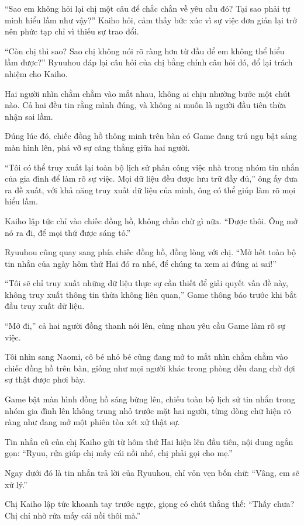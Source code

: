 \documentclass[../main.tex]{subfiles}
\begin{document}
``Sao em không hỏi lại chị một câu để chắc chắn về yêu cầu đó? Tại sao phải tự mình hiểu lầm như vậy?'' Kaiho hỏi, cảm thấy bức xúc vì sự việc đơn giản lại trở nên phức tạp chỉ vì thiếu sự trao đổi.

``Còn chị thì sao? Sao chị không nói rõ ràng hơn từ đầu để em không thể hiểu lầm được?'' Ryuuhou đáp lại câu hỏi của chị bằng chính câu hỏi đó, đổ lại trách nhiệm cho Kaiho.

Hai người nhìn chằm chằm vào mắt nhau, không ai chịu nhường bước một chút nào. Cả hai đều tin rằng mình đúng, và không ai muốn là người đầu tiên thừa nhận sai lầm.

Đúng lúc đó, chiếc đồng hồ thông minh trên bàn có Game đang trú ngụ bật sáng màn hình lên, phá vỡ sự căng thẳng giữa hai người.

``Tôi có thể truy xuất lại toàn bộ lịch sử phân công việc nhà trong nhóm tin nhắn của gia đình để làm rõ sự việc. Mọi dữ liệu đều được lưu trữ đầy đủ,'' ông ấy đưa ra đề xuất, với khả năng truy xuất dữ liệu của mình, ông có thể giúp làm rõ mọi hiểu lầm.

Kaiho lập tức chỉ vào chiếc đồng hồ, không chần chừ gì nữa. ``Được thôi. Ông mở nó ra đi, để mọi thứ được sáng tỏ.''

Ryuuhou cũng quay sang phía chiếc đồng hồ, đồng lòng với chị. ``Mở hết toàn bộ tin nhắn của ngày hôm thứ Hai đó ra nhé, để chúng ta xem ai đúng ai sai!''

``Tôi sẽ chỉ truy xuất những dữ liệu thực sự cần thiết để giải quyết vấn đề này, không truy xuất thông tin thừa không liên quan,'' Game thông báo trước khi bắt đầu truy xuất dữ liệu.

``Mở đi,'' cả hai người đồng thanh nói lên, cùng nhau yêu cầu Game làm rõ sự việc.

Tôi nhìn sang Naomi, cô bé nhỏ bé cũng đang mở to mắt nhìn chằm chằm vào chiếc đồng hồ trên bàn, giống như mọi người khác trong phòng đều đang chờ đợi sự thật được phơi bày.

Game bật màn hình đồng hồ sáng bừng lên, chiếu toàn bộ lịch sử tin nhắn trong nhóm gia đình lên không trung nhỏ trước mặt hai người, từng dòng chữ hiện rõ ràng như đang mở một phiên tòa xét xử thật sự.

Tin nhắn cũ của chị Kaiho gửi từ hôm thứ Hai hiện lên đầu tiên, nội dung ngắn gọn: ``Ryuu, rửa giúp chị mấy cái nồi nhé, chị phải gọi cho mẹ.''

Ngay dưới đó là tin nhắn trả lời của Ryuuhou, chỉ vỏn vẹn bốn chữ: ``Vâng, em sẽ xử lý.''

Chị Kaiho lập tức khoanh tay trước ngực, giọng có chút thắng thế: ``Thấy chưa? Chị chỉ nhờ rửa mấy cái nồi thôi mà.''
\end{document}
